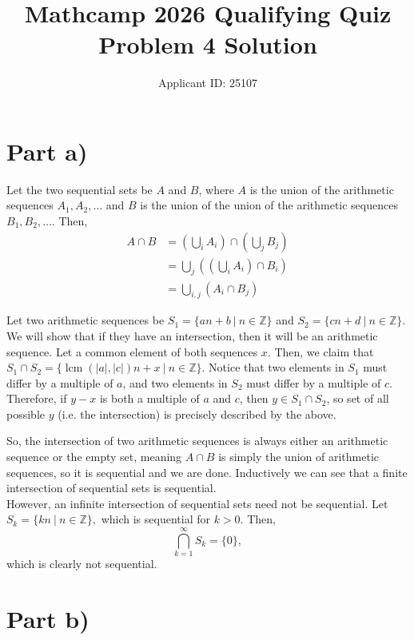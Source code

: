\documentclass{article}
\title{Mathcamp 2026 Qualifying Quiz Problem 4 Solution}
\author{Applicant ID: 25107}
\date{}
\DeclareMathOperator{\lcm}{lcm}
\begin{document}
	
	\maketitle
	
	\section*{Part a)}

    Let the two sequential sets be $A$ and $B$, where $A$ is the union of the arithmetic sequences $A_1, A_2, \dots $ and $B$ is the union of the union of the arithmetic sequences $B_1, B_2, \dots $. Then, 
    \begin{align*}
        A\cap B &= \left(\bigcup_i A_i\right) \cap \left(\bigcup_j B_j\right) \\
        &= \bigcup_j \left(\left(\bigcup_i A_i\right)\cap B_i\right)\\
        &= \bigcup_{i, j} (A_i\cap B_j)
    \end{align*}

    Let two arithmetic sequences be $S_1 = \{an + b\ |\ n\in \mathbb{Z}\}$ and $S_2 = \{cn + d\ |\ n\in \mathbb{Z}\}$. We will show that if they have an intersection, then it will be an arithmetic sequence. Let a common element of both sequences $x$. Then, we claim that $S_1\cap S_2 = \{\lcm(|a|, |c|)n + x\ |\ n \in \mathbb{Z}\}.$ Notice that two elements in $S_1$ must differ by a multiple of $a$, and two elements in $S_2$ must differ by a multiple of $c$. Therefore, if $y - x$ is both a multiple of $a$ and $c$, then $y\in S_1\cap S_2$, so set of all possible $y$ (i.e. the intersection) is precisely described by the above.

    So, the intersection of two arithmetic sequences is always either an arithmetic sequence or the empty set, meaning $A\cap B$ is simply the union of arithmetic sequences, so it is sequential and we are done. Inductively we can see that a finite intersection of sequential sets is sequential.\\

    However, an infinite intersection of sequential sets need not be sequential. Let $S_k = \{kn\ |\ n\in \mathbb{Z}\},$ which is sequential for $k > 0$. Then,
    $$\bigcap_{k = 1}^\infty S_k = \{0\},$$ which is clearly not sequential.

    \section*{Part b)}
\end{document}
